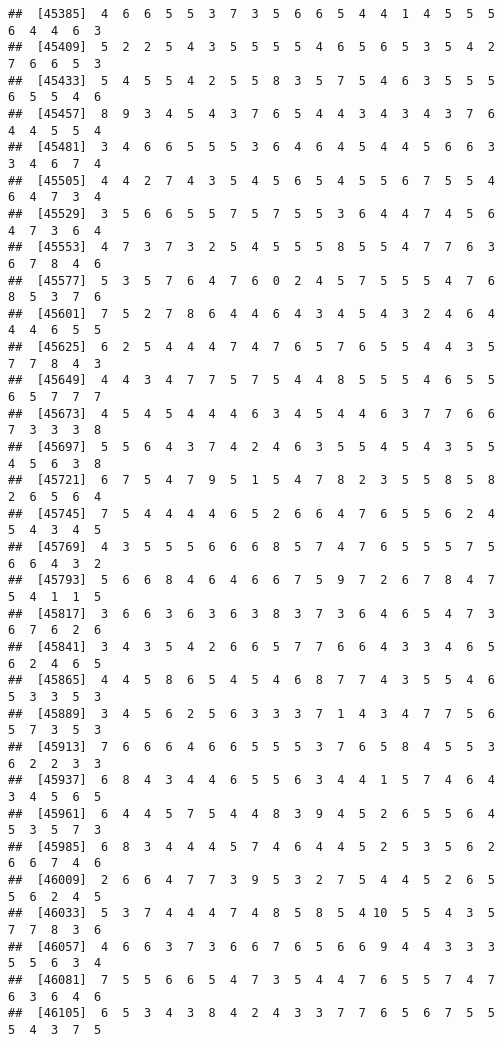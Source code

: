 \documentclass[
]{book}
\begin{document}
\begin{verbatim}
##  [45385]  4  6  6  5  5  3  7  3  5  6  6  5  4  4  1  4  5  5  5  6  4  4  6  3
##  [45409]  5  2  2  5  4  3  5  5  5  5  4  6  5  6  5  3  5  4  2  7  6  6  5  3
##  [45433]  5  4  5  5  4  2  5  5  8  3  5  7  5  4  6  3  5  5  5  6  5  5  4  6
##  [45457]  8  9  3  4  5  4  3  7  6  5  4  4  3  4  3  4  3  7  6  4  4  5  5  4
##  [45481]  3  4  6  6  5  5  5  3  6  4  6  4  5  4  4  5  6  6  3  3  4  6  7  4
##  [45505]  4  4  2  7  4  3  5  4  5  6  5  4  5  5  6  7  5  5  4  6  4  7  3  4
##  [45529]  3  5  6  6  5  5  7  5  7  5  5  3  6  4  4  7  4  5  6  4  7  3  6  4
##  [45553]  4  7  3  7  3  2  5  4  5  5  5  8  5  5  4  7  7  6  3  6  7  8  4  6
##  [45577]  5  3  5  7  6  4  7  6  0  2  4  5  7  5  5  5  4  7  6  8  5  3  7  6
##  [45601]  7  5  2  7  8  6  4  4  6  4  3  4  5  4  3  2  4  6  4  4  4  6  5  5
##  [45625]  6  2  5  4  4  4  7  4  7  6  5  7  6  5  5  4  4  3  5  7  7  8  4  3
##  [45649]  4  4  3  4  7  7  5  7  5  4  4  8  5  5  5  4  6  5  5  6  5  7  7  7
##  [45673]  4  5  4  5  4  4  4  6  3  4  5  4  4  6  3  7  7  6  6  7  3  3  3  8
##  [45697]  5  5  6  4  3  7  4  2  4  6  3  5  5  4  5  4  3  5  5  4  5  6  3  8
##  [45721]  6  7  5  4  7  9  5  1  5  4  7  8  2  3  5  5  8  5  8  2  6  5  6  4
##  [45745]  7  5  4  4  4  4  6  5  2  6  6  4  7  6  5  5  6  2  4  5  4  3  4  5
##  [45769]  4  3  5  5  5  6  6  6  8  5  7  4  7  6  5  5  5  7  5  6  6  4  3  2
##  [45793]  5  6  6  8  4  6  4  6  6  7  5  9  7  2  6  7  8  4  7  5  4  1  1  5
##  [45817]  3  6  6  3  6  3  6  3  8  3  7  3  6  4  6  5  4  7  3  6  7  6  2  6
##  [45841]  3  4  3  5  4  2  6  6  5  7  7  6  6  4  3  3  4  6  5  6  2  4  6  5
##  [45865]  4  4  5  8  6  5  4  5  4  6  8  7  7  4  3  5  5  4  6  5  3  3  5  3
##  [45889]  3  4  5  6  2  5  6  3  3  3  7  1  4  3  4  7  7  5  6  5  7  3  5  3
##  [45913]  7  6  6  6  4  6  6  5  5  5  3  7  6  5  8  4  5  5  3  6  2  2  3  3
##  [45937]  6  8  4  3  4  4  6  5  5  6  3  4  4  1  5  7  4  6  4  3  4  5  6  5
##  [45961]  6  4  4  5  7  5  4  4  8  3  9  4  5  2  6  5  5  6  4  5  3  5  7  3
##  [45985]  6  8  3  4  4  4  5  7  4  6  4  4  5  2  5  3  5  6  2  6  6  7  4  6
##  [46009]  2  6  6  4  7  7  3  9  5  3  2  7  5  4  4  5  2  6  5  5  6  2  4  5
##  [46033]  5  3  7  4  4  4  7  4  8  5  8  5  4 10  5  5  4  3  5  7  7  8  3  6
##  [46057]  4  6  6  3  7  3  6  6  7  6  5  6  6  9  4  4  3  3  3  5  5  6  3  4
##  [46081]  7  5  5  6  6  5  4  7  3  5  4  4  7  6  5  5  7  4  7  6  3  6  4  6
##  [46105]  6  5  3  4  3  8  4  2  4  3  3  7  7  6  5  6  7  5  5  5  4  3  7  5

\end{verbatim}
\end{document}
